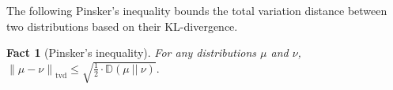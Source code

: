 \documentclass[11pt]{article}
\newtheorem{proposition}[lemma]{Proposition}
\newtheorem{fact}[lemma]{Fact}
\theoremstyle{definition}
\renewcommand{\leq}{\leqslant}
\renewcommand{\geq}{\geqslant}
\newcommand{\tvd}[2]{\ensuremath{\norm{#1 - #2}_{\mathrm{tvd}}}}
\newcommand{\paren}[1]{\ensuremath{\left(#1\right)}\xspace}
\newcommand{\card}[1]{\left\vert{#1}\right\vert}
\newcommand{\norm}[1]{\ensuremath{\|#1\|}}
\newcommand{\set}[1]{\ensuremath{\left\{ #1 \right\}}}
\newcommand{\rv}[1]{\ensuremath{{\mathsf{#1}}}\xspace}
\newcommand{\rX}{\rv{X}}
\newcommand{\rY}{\rv{Y}}
\newcommand{\kl}[2]{\ensuremath{\mathbb{D}(#1~||~#2)}}
\begin{document}

The following Pinsker's inequality bounds the total variation distance between two distributions based on their KL-divergence.

\begin{fact}[Pinsker's inequality]\label{fact:pinskers}
	For any distributions $\mu$ and $\nu$, 
	$
	\tvd{\mu}{\nu} \leq \sqrt{\frac{1}{2} \cdot \kl{\mu}{\nu}}.
	$ 
\end{fact}


%
%

\end{document}

